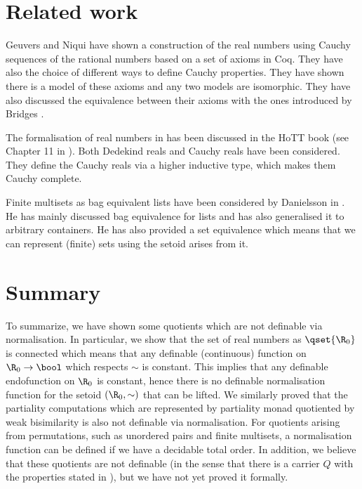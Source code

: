\section{Related work}

Geuvers and Niqui have shown a construction of the real numbers using Cauchy sequences of the rational numbers based on a set of axioms in Coq. They have also the choice of different ways to define Cauchy properties. They have shown there is a model of these axioms and any two models are isomorphic. They have also discussed the equivalence between their axioms with the ones introduced by Bridges \cite{Bridges199995}.

The formalisation of real numbers in \hott has been discussed in the HoTT book (see Chapter 11 in \cite{hott}). Both Dedekind reals and Cauchy reals have been considered. 
They define the Cauchy reals via a higher inductive type, which makes them Cauchy complete.

Finite multisets as bag equivalent lists have been considered by Danielsson in \cite{DBLP:conf/itp/Danielsson12}. He has mainly discussed bag equivalence for lists and has also generalised it to arbitrary containers. He has also provided a set equivalence which means that we can represent (finite) sets using the setoid arises from it.


\section{Summary}

To summarize, we have shown some quotients which are not definable via normalisation.
In particular, we show that the set of real numbers as $\qset{\R_0}$ is connected which means that any definable (continuous) function on $\R_0 \to \bool$ which respects $\sim$ is constant. 
This implies that any definable endofunction on $\R_0$ is constant, hence there is no definable normalisation function for the setoid $(\R_0,\sim)$ that can be lifted. 
We similarly proved that the partiality computations which are represented by partiality monad quotiented by weak bisimilarity is also not definable via normalisation. 
For quotients arising from permutations, such as unordered pairs and finite multisets, a normalisation function can be defined if we have a decidable total order. 
In addition, we believe that these quotients are not definable (in the sense that there is a carrier $Q$ with the properties stated in ), but we have not yet proved it formally.















